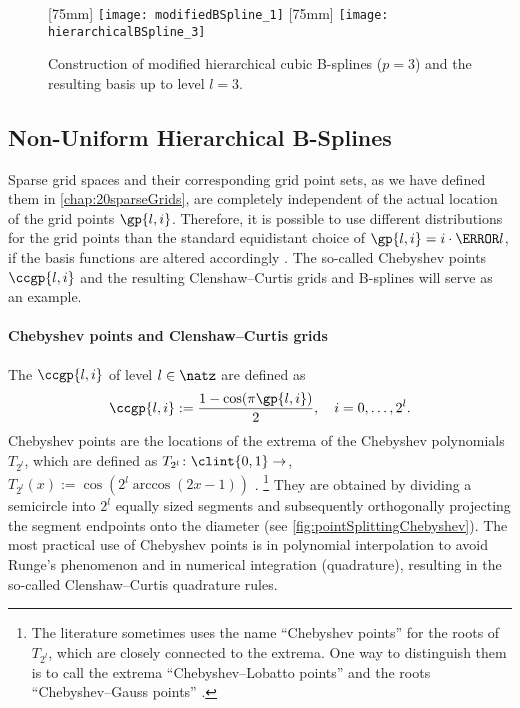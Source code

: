 \begin{figure}
  [75mm]{%
    \texttt{[image: modifiedBSpline\_1]}%
  }%
  \hfill%
  [75mm]{%
    \texttt{[image: hierarchicalBSpline\_3]}%
  }%
  \caption[%
    Modified hierarchical B-splines%
  ]{%
    Construction of modified hierarchical cubic B-splines ($p = 3$) and
    the resulting basis up to level $l = 3$.%
  }%
  \label{fig:modifiedBSpline}%
\end{figure}



\subsection{Non-Uniform Hierarchical B-Splines}
\label{sec:314nonUniform}

Sparse grid spaces and their corresponding grid point sets,
as we have defined them in \cref{chap:20sparseGrids},
are completely independent of the actual location of the grid points
$\gp{l,i}$.
Therefore, it is possible to use different distributions for the grid points
than the standard equidistant choice of $\gp{l,i} = i \cdot \ms{l}$,
if the basis functions are altered accordingly
\cite{Valentin14Hierarchische}.
The so-called Chebyshev points $\ccgp{l,i}$ and the
resulting Clenshaw--Curtis grids and B-splines will serve as an example.

\paragraph{Chebyshev points and Clenshaw--Curtis grids}

The  $\ccgp{l,i}$ of level $l \in \natz$
are defined as
\begin{equation}
  \ccgp{l,i}
  := \frac{1 - \cos(\pi \gp{l,i})}{2},\quad
  i = 0, \dotsc, 2^l.
\end{equation}
Chebyshev points are the locations of the extrema of the
Chebyshev polynomials $T_{2^l}$, which are defined as
$T_{2^l}\colon \clint{0, 1} \to \real$,
$T_{2^l}(x) := \cos(2^l \arccos(2x - 1))$ \cite{Xu16Chebyshev}.%
\footnote{%
  The literature sometimes uses the name ``Chebyshev points'' for
  the roots of $T_{2^l}$, which are closely connected to the extrema.
  One way to distinguish them is to call the extrema
  ``Chebyshev--Lobatto points'' and the roots
  ``Chebyshev--Gauss points'' \cite{Xu16Chebyshev}.%
}
They are obtained by dividing a semicircle into $2^l$ equally sized
segments and subsequently orthogonally projecting the
segment endpoints onto the diameter
(see \cref{fig:pointSplittingChebyshev}).
The most practical use of Chebyshev points is in
polynomial interpolation to avoid Runge's phenomenon and in
numerical integration (quadrature), resulting in the
so-called Clenshaw--Curtis quadrature rules.

